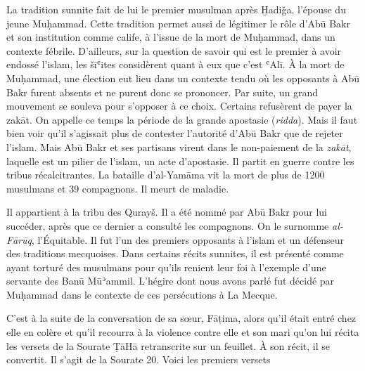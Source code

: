 {

La tradition sunnite fait de lui le premier musulman après Ḫadiǧa,
l'épouse du jeune Muḥammad. Cette tradition permet aussi de légitimer le
rôle d'Abū Bakr et son institution comme calife, à l'issue de la mort de
Muḥammad, dans un contexte fébrile. D'ailleurs, sur la question de
savoir qui est le premier à avoir endossé l'islam, les šīʿites
considèrent quant à eux que c'est ʿAlī. À la mort de Muḥammad, une
élection eut lieu dans un contexte tendu où les opposants à Abū Bakr
furent absents et ne purent donc se prononcer. Par suite, un grand
mouvement se souleva pour s'opposer à ce choix. Certains refusèrent de
payer la zakāt. On appelle ce temps la période de la grande apostasie
(\emph{ridda}). Mais il faut bien voir qu'il s'agissait plus de
contester l'autorité d'Abū Bakr que de rejeter l'islam. Mais Abū Bakr et
ses partisans virent dans le non-paiement de la \emph{zakāt}, laquelle
est un pilier de l'islam, un acte d'apostasie. Il partit en guerre
contre les tribus récalcitrantes. La bataille d'al-Yamāma vit la mort de
plus de 1200 musulmans et 39 compagnons. Il meurt de maladie.


Il appartient à la tribu des Qurayš. Il a été nommé par Abū Bakr pour
lui succéder, après que ce dernier a consulté les compagnons. On le
surnomme \emph{al-Fārūq}, l'Équitable. Il fut l'un des premiers
opposants à l'islam et un défenseur des traditions mecquoises. Dans
certains récits sunnites, il est présenté comme ayant torturé des
musulmans pour qu'ils renient leur foi à l'exemple d'une servante des
Banū Mūʾammil. L'hégire dont nous avons parlé fut décidé par Muḥammad
dans le contexte de ces persécutions à La Mecque.

C'est à la suite de la conversation de sa sœur, Fāṭima, alors qu'il
était entré chez elle en colère et qu'il recourra à la violence contre
elle et son mari qu'on lui récita les versets de la Sourate ṬāHā
retranscrite sur un feuillet. À son récit, il se convertit. Il s'agit de
la Sourate 20. Voici les premiers versets

}
